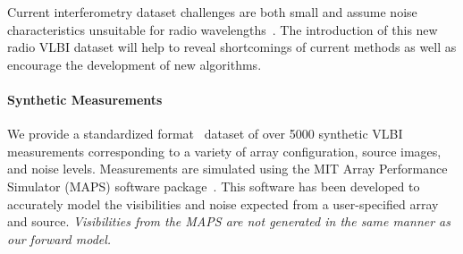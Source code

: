 Current interferometry dataset challenges are both small
and assume noise characteristics unsuitable for radio wavelengths~\cite{baron20122012, lawson2004interferometry}.
The introduction of this new radio VLBI dataset will help to reveal shortcomings of current methods as well as encourage the development of new algorithms. 






\vspace{-.2in}
\paragraph{Synthetic Measurements}

We provide a standardized format~\cite{ pauls2005data} dataset of over 5000 synthetic VLBI measurements corresponding to
a variety of array configuration, source images, and noise levels. 
Measurements are simulated using the MIT Array Performance Simulator (MAPS) software package~\cite{rusenimaging}.
This software has been developed to accurately model the visibilities and noise expected from a user-specified array and source. {\it Visibilities from the MAPS are not generated in the same manner as our forward model.} 


